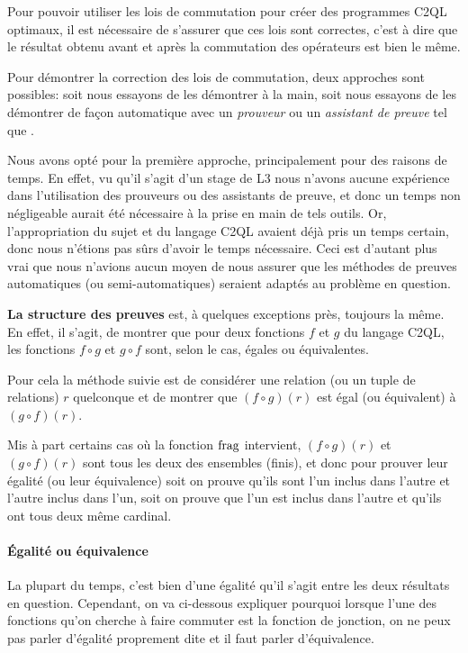 Pour pouvoir utiliser les lois de commutation
pour créer des programmes C2QL optimaux,
il est nécessaire de s'assurer que ces lois sont correctes,
c'est à dire que le résultat obtenu avant et après la
commutation des opérateurs est bien le même.

Pour démontrer la correction des lois de commutation,
deux approches sont possibles:
soit nous essayons de les démontrer à la main,
soit nous essayons de les démontrer de façon automatique
avec un \emph{prouveur} ou un \emph{assistant de preuve}
tel que .

Nous avons opté pour la première approche,
principalement pour des raisons de temps.
En effet, vu qu'il s'agit d'un stage de L3
nous n'avons aucune expérience dans l'utilisation
des prouveurs ou des assistants de preuve,
et donc un temps non négligeable aurait été nécessaire
à la prise en main de tels outils.
Or, l'appropriation du sujet et du langage C2QL
avaient déjà pris un temps certain, donc
nous n'étions pas sûrs d'avoir le temps nécessaire.
Ceci est d'autant plus vrai que nous n'avions
aucun moyen de nous assurer que les méthodes 
de preuves automatiques (ou semi-automatiques) seraient
adaptés au problème en question.

\textbf{La structure des preuves} est,
à quelques exceptions près, toujours la même.
En effet, il s'agit, de montrer que pour deux fonctions
$f$ et $g$ du langage C2QL, les fonctions
$f \circ g$ et $g \circ f$ sont, selon le cas,
égales ou équivalentes.

Pour cela la méthode suivie est de considérer une relation
(ou un tuple de relations) $r$ quelconque et de montrer
que $(f \circ g) (r)$ est égal (ou équivalent)
à $(g \circ f) (r)$.

Mis à part certains cas où la fonction
$\operatorname{frag}$ intervient,
$(f \circ g) (r)$ et $(g \circ f) (r)$ sont tous les deux
des ensembles (finis), et donc pour prouver leur égalité
(ou leur équivalence) soit on prouve qu'ils sont
l'un inclus dans l'autre et l'autre inclus dans l'un,
soit on prouve que l'un est inclus dans l'autre et qu'ils
ont tous deux même cardinal.

\paragraph{Égalité ou équivalence}
La plupart du temps, c'est bien d'une égalité qu'il s'agit
entre les deux résultats en question.
Cependant, on va ci-dessous expliquer pourquoi
lorsque l'une des fonctions qu'on cherche à faire commuter
est la fonction de jonction, on ne peux pas parler
d'égalité proprement dite et il faut parler d'équivalence.

